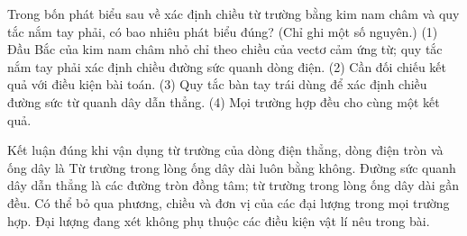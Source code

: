 \begin{ex}
Trong bốn phát biểu sau về xác định chiều từ trường bằng kim nam châm và quy tắc nắm tay phải, có bao nhiêu phát biểu đúng? (Chỉ ghi một số nguyên.) (1) Đầu Bắc của kim nam châm nhỏ chỉ theo chiều của vectơ cảm ứng từ; quy tắc nắm tay phải xác định chiều đường sức quanh dòng điện. (2) Cần đối chiếu kết quả với điều kiện bài toán. (3) Quy tắc bàn tay trái dùng để xác định chiều đường sức từ quanh dây dẫn thẳng. (4) Mọi trường hợp đều cho cùng một kết quả.
\end{ex}

\begin{ex}
Kết luận đúng khi vận dụng từ trường của dòng điện thẳng, dòng điện tròn và ống dây là
\choice
{Từ trường trong lòng ống dây dài luôn bằng không.}
{\True Đường sức quanh dây dẫn thẳng là các đường tròn đồng tâm; từ trường trong lòng ống dây dài gần đều.}
{Có thể bỏ qua phương, chiều và đơn vị của các đại lượng trong mọi trường hợp.}
{Đại lượng đang xét không phụ thuộc các điều kiện vật lí nêu trong bài.}
\end{ex}

